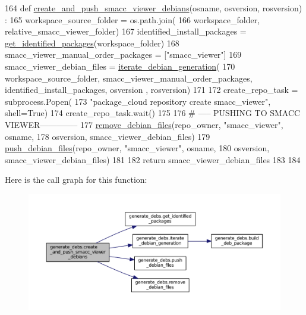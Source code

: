\begin{DoxyCode}
164 \textcolor{keyword}{def }\hyperlink{namespacegenerate__debs_a9a6167ed98fbdc7b1e1c56da5652cf19}{create\_and\_push\_smacc\_viewer\_debians}(osname, osversion, rosversion)
      :
165     workspace\_source\_folder = os.path.join(
166         workspace\_folder, relative\_smacc\_viewer\_folder)
167     identified\_install\_packages = \hyperlink{namespacegenerate__debs_aa91b87c6d9c3ed04015845cc9298431a}{get\_identified\_packages}(workspace\_folder)
168     smacc\_viewer\_manual\_order\_packages = [\textcolor{stringliteral}{"smacc\_viewer"}]
169     smacc\_viewer\_debian\_files = \hyperlink{namespacegenerate__debs_a2615a6fc7860b6aa9e920e6b4d886589}{iterate\_debian\_generation}(
170         workspace\_source\_folder, smacc\_viewer\_manual\_order\_packages, identified\_install\_packages, osversion
      , rosversion)
171 
172     create\_repo\_task = subprocess.Popen(
173         \textcolor{stringliteral}{"package\_cloud repository create smacc\_viewer"}, shell=\textcolor{keyword}{True})
174     create\_repo\_task.wait()
175 
176     \textcolor{comment}{# ----- PUSHING TO SMACC VIEWER--------------}
177     \hyperlink{namespacegenerate__debs_a08095040d038b3613ad0e77fd4e7f60e}{remove\_debian\_files}(repo\_owner, \textcolor{stringliteral}{"smacc\_viewer"},  osname,
178                         osversion, smacc\_viewer\_debian\_files)
179     \hyperlink{namespacegenerate__debs_a9b22f5ad65b40b7903c467eda308e575}{push\_debian\_files}(repo\_owner, \textcolor{stringliteral}{"smacc\_viewer"}, osname,
180                       osversion, smacc\_viewer\_debian\_files)
181 
182     \textcolor{keywordflow}{return} smacc\_viewer\_debian\_files
183 
184 
\end{DoxyCode}


Here is the call graph for this function\+:
\nopagebreak
\begin{figure}[H]
\begin{center}
\leavevmode
\includegraphics[width=350pt]{namespacegenerate__debs_a9a6167ed98fbdc7b1e1c56da5652cf19_cgraph}
\end{center}
\end{figure}


